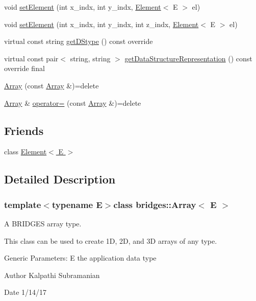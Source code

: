 \begin{DoxyCompactItemize}
void \hyperlink{classbridges_1_1_array_a428cc76d22af71c5ae57dc293780b8ec}{set\+Element} (int x\+\_\+indx, int y\+\_\+indx, \hyperlink{classbridges_1_1_element}{Element}$<$ E $>$ el)
\item 
void \hyperlink{classbridges_1_1_array_a526c3a190b48a338541e5b4667c5eedf}{set\+Element} (int x\+\_\+indx, int y\+\_\+indx, int z\+\_\+indx, \hyperlink{classbridges_1_1_element}{Element}$<$ E $>$ el)
\item 
virtual const string \hyperlink{classbridges_1_1_array_afe4174bc21eaafa316584894cf4732b1}{get\+D\+Stype} () const  override
\item 
virtual const pair$<$ string, string $>$ \hyperlink{classbridges_1_1_array_adc13651f1b228d222772e2f5df16229b}{get\+Data\+Structure\+Representation} () const  override final
\item 
\hyperlink{classbridges_1_1_array_a3229045173ac984ca452e613b1ce1fa3}{Array} (const \hyperlink{classbridges_1_1_array}{Array} \&)=delete
\item 
\hyperlink{classbridges_1_1_array}{Array} \& \hyperlink{classbridges_1_1_array_af8a8b4fc43f57020db39207c80403e6f}{operator=} (const \hyperlink{classbridges_1_1_array}{Array} \&)=delete
\end{DoxyCompactItemize}
\subsection*{Friends}
\begin{DoxyCompactItemize}
\item 
class \hyperlink{classbridges_1_1_array_a8c6ff2a8dd3e27346dd25f588a78828a}{Element$<$ E $>$}
\end{DoxyCompactItemize}


\subsection{Detailed Description}
\subsubsection*{template$<$typename E$>$class bridges\+::\+Array$<$ E $>$}

A B\+R\+I\+D\+G\+E\+S array type. 

This class can be used to create 1\+D, 2\+D, and 3\+D arrays of any type.

Generic Parameters\+: E the application data type

\begin{DoxyAuthor}{Author}
Kalpathi Subramanian 
\end{DoxyAuthor}
\begin{DoxyDate}{Date}
1/14/17 
\end{DoxyDate}


